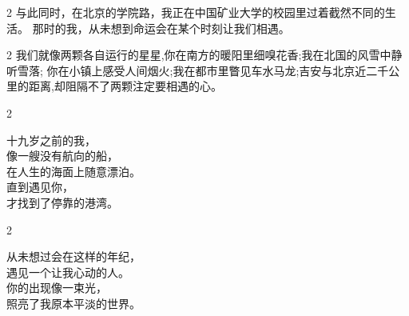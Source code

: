 \large
\begin{spacing}{2}
    与此同时，在北京的学院路，我正在中国矿业大学的校园里过着截然不同的生活。
    那时的我，从未想到命运会在某个时刻让我们相遇。
\end{spacing}


\large
\begin{spacing}{2}
    我们就像两颗各自运行的星星,你在南方的暖阳里细嗅花香;我在北国的风雪中静听雪落;
    你在小镇上感受人间烟火;我在都市里瞥见车水马龙;吉安与北京近二千公里的距离,却阻隔不了两颗注定要相遇的心。
\end{spacing}


\clearpage

\subtitle{相遇前的独白}


\large
\begin{spacing}{2}
    \begin{center}
        十九岁之前的我，\\
        像一艘没有航向的船，\\
        在人生的海面上随意漂泊。\\
        直到遇见你，\\
        才找到了停靠的港湾。
    \end{center}
\end{spacing}


\large
\begin{spacing}{2}
    \begin{center}
        从未想过会在这样的年纪，\\
        遇见一个让我心动的人。\\
        你的出现像一束光，\\
        照亮了我原本平淡的世界。
    \end{center}
\end{spacing}

\clearpage

\subtitle{相遇——初见几何}

